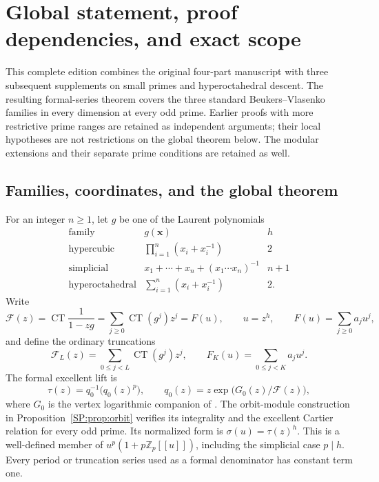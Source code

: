 \documentclass[11pt,a4paper]{article}
\theoremstyle{definition}\newtheorem{definition}[theorem]{Definition}
\theoremstyle{remark}\newtheorem{remark}[theorem]{Remark}
\DeclareMathOperator{\CT}{CT}
\numberwithin{equation}{section}
\begin{document}
\section{Global statement, proof dependencies, and exact scope}
\label{sec:unified-guide}\label{G:sec:guide}

This complete edition combines the original four-part manuscript with
three subsequent supplements on small primes and hyperoctahedral descent.
The resulting formal-series theorem covers the three standard
Beukers--Vlasenko families in every dimension at every odd prime.
Earlier proofs with more restrictive prime ranges are retained as
independent arguments; their local hypotheses are not restrictions on
the global theorem below. The modular extensions and their separate
prime conditions are retained as well.

\subsection{Families, coordinates, and the global theorem}
For an integer $n\ge1$, let $g$ be one of the Laurent polynomials
\[
\begin{array}{c|c|c}
\text{family}&g(\mathbf x)&h\\\hline
\text{hypercubic}&\displaystyle\prod_{i=1}^n(x_i+x_i^{-1})&2\\[3pt]
\text{simplicial}&\displaystyle x_1+\cdots+x_n+(x_1\cdots x_n)^{-1}&n+1\\[3pt]
\text{hyperoctahedral}&\displaystyle\sum_{i=1}^n(x_i+x_i^{-1})&2.
\end{array}
\]
Write
\[
 \mathcal F(z)=\CT\frac1{1-zg}
       =\sum_{j\ge0}\CT(g^j)z^j=F(u),\qquad u=z^h,
 \qquad F(u)=\sum_{j\ge0}a_ju^j,
\]
and define the ordinary truncations
\[
 \mathcal F_L(z)=\sum_{0\le j<L}\CT(g^j)z^j,
 \qquad F_K(u)=\sum_{0\le j<K}a_ju^j.
\]
The formal excellent lift is
\[
 \tau(z)=q_0^{-1}\bigl(q_0(z)^p\bigr),\qquad
 q_0(z)=z\exp\bigl(G_0(z)/\mathcal F(z)\bigr),
\]
where $G_0$ is the vertex logarithmic companion of
\cite[Proposition~9.1]{BV3}. The orbit-module construction in
Proposition~\ref{SP:prop:orbit} verifies its integrality and the excellent
Cartier relation for every odd prime. Its normalized form is
$\sigma(u)=\tau(z)^h$. This is a well-defined member of
$u^p(1+p\mathbb Z_p[[u]])$, including the simplicial case $p\mid h$.
Every period or truncation series used as a formal denominator has
constant term one.
\end{document}
